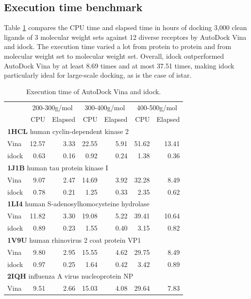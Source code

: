 \subsection{Execution time benchmark}

Table \ref{istar:ExecutionTime} compares the CPU time and elapsed time in hours of docking 3,000 clean ligands of 3 molecular weight sets against 12 diverse receptors by AutoDock Vina and idock. The execution time varied a lot from protein to protein and from molecular weight set to molecular weight set. Overall, idock outperformed AutoDock Vina by at least 8.69 times and at most 37.51 times, making idock particularly ideal for large-scale docking, as is the case of istar.

\begin{table}
\caption{Execution time of AutoDock Vina and idock.}
\label{istar:ExecutionTime}
\begin{tabular}{lrrrrrr}
\hline
& \multicolumn{2}{c}{200-300g/mol} & \multicolumn{2}{c}{300-400g/mol} & \multicolumn{2}{c}{400-500g/mol}\\
& CPU & Elapsed & CPU & Elapsed & CPU & Elapsed\\
\hline
\multicolumn{7}{l}{\textbf{1HCL} human cyclin-dependent kinase 2}\\
Vina  & 12.57 &  3.33 & 22.55 &  5.91 & 51.62 & 13.41\\
idock &  0.63 &  0.16 &  0.92 &  0.24 &  1.38 &  0.36\\
\multicolumn{7}{l}{\textbf{1J1B} human tau protein kinase I}\\
Vina  &  9.07 &  2.47 & 14.69 &  3.92 & 32.28 &  8.49\\
idock &  0.78 &  0.21 &  1.25 &  0.33 &  2.35 &  0.62\\
\multicolumn{7}{l}{\textbf{1LI4} human S-adenosylhomocysteine hydrolase}\\
Vina  & 11.82 &  3.30 & 19.08 &  5.22 & 39.41 & 10.64\\
idock &  0.89 &  0.23 &  1.55 &  0.40 &  3.15 &  0.82\\
\multicolumn{7}{l}{\textbf{1V9U} human rhinovirus 2 coat protein VP1}\\
Vina  &  9.80 &  2.95 & 15.55 &  4.62 & 29.75 &  8.49\\
idock &  0.97 &  0.25 &  1.64 &  0.42 &  3.42 &  0.89\\
\multicolumn{7}{l}{\textbf{2IQH} influenza A virus nucleoprotein NP}\\
Vina  &  9.51 &  2.66 & 15.03 &  4.08 & 29.64 &  7.83\\

\end{tabular}
\end{table}

